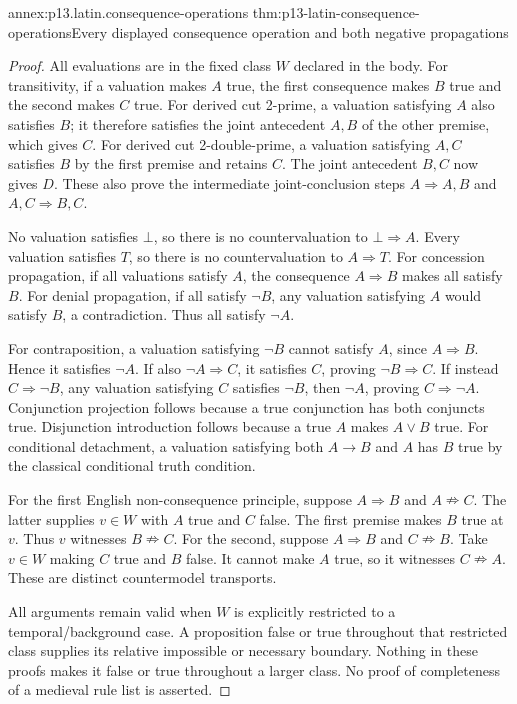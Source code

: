 \begin{annexitem}{annex:p13.latin.consequence-operations}
 {thm:p13-latin-consequence-operations}{Every displayed consequence operation and both negative propagations}
\begin{proof}
All evaluations are in the fixed class \(W\) declared in the body.
For transitivity, if a valuation makes \(A\) true, the first consequence
makes \(B\) true and the second makes \(C\) true.
For derived cut 2-prime, a valuation satisfying \(A\) also satisfies \(B\);
it therefore satisfies the joint antecedent \(A,B\) of the other premise,
which gives \(C\).
For derived cut 2-double-prime, a valuation satisfying \(A,C\) satisfies
\(B\) by the first premise and retains \(C\). The joint antecedent
\(B,C\) now gives \(D\). These also prove the intermediate joint-conclusion
steps \(A\Rightarrow A,B\) and \(A,C\Rightarrow B,C\).

No valuation satisfies \(\bot\), so there is no countervaluation to
\(\bot\Rightarrow A\). Every valuation satisfies \(T\), so there is
no countervaluation to \(A\Rightarrow T\).
For concession propagation, if all valuations satisfy \(A\), the
consequence \(A\Rightarrow B\) makes all satisfy \(B\).
For denial propagation, if all satisfy \(\neg B\), any valuation
satisfying \(A\) would satisfy \(B\), a contradiction. Thus all satisfy
\(\neg A\).

For contraposition, a valuation satisfying \(\neg B\) cannot satisfy \(A\),
since \(A\Rightarrow B\). Hence it satisfies \(\neg A\).
If also \(\neg A\Rightarrow C\), it satisfies \(C\), proving
\(\neg B\Rightarrow C\).
If instead \(C\Rightarrow\neg B\), any valuation satisfying \(C\)
satisfies \(\neg B\), then \(\neg A\), proving \(C\Rightarrow\neg A\).
Conjunction projection follows because a true conjunction has both
conjuncts true. Disjunction introduction follows because a true \(A\)
makes \(A\lor B\) true. For conditional detachment, a valuation satisfying
both \(A\to B\) and \(A\) has \(B\) true by the classical conditional
truth condition.

For the first English non-consequence principle, suppose
\(A\Rightarrow B\) and \(A\nRightarrow C\).
The latter supplies \(v\in W\) with \(A\) true and \(C\) false.
The first premise makes \(B\) true at \(v\). Thus \(v\) witnesses
\(B\nRightarrow C\).
For the second, suppose \(A\Rightarrow B\) and \(C\nRightarrow B\).
Take \(v\in W\) making \(C\) true and \(B\) false. It cannot make
\(A\) true, so it witnesses \(C\nRightarrow A\).
These are distinct countermodel transports.

All arguments remain valid when \(W\) is explicitly restricted to a
temporal/background case. A proposition false or true throughout that
restricted class supplies its relative impossible or necessary boundary.
Nothing in these proofs makes it false or true throughout a larger class.
No proof of completeness of a medieval rule list is asserted.
\end{proof}
\end{annexitem}

